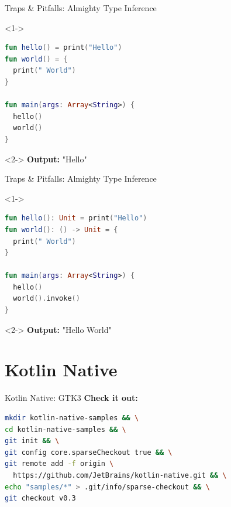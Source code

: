 \begin{frame}[fragile]{Traps \& Pitfalls: Almighty Type Inference}
	\begin{overlayarea}{\textwidth}{.6\textheight}
		\begin{onlyenv}<1->
\begin{lstlisting}[language=Kotlin,basicstyle=\ttfamily\small]
fun hello() = print("Hello")
fun world() = {
  print(" World")
}

fun main(args: Array<String>) {
  hello()
  world()
}	
\end{lstlisting}
		\end{onlyenv}
		\begin{onlyenv}<2->
			\textbf{Output:} "Hello"
		\end{onlyenv}
	\end{overlayarea}
\end{frame}

\begin{frame}[fragile]{Traps \& Pitfalls: Almighty Type Inference}
	\begin{overlayarea}{\textwidth}{.6\textheight}
		\begin{onlyenv}<1->
\begin{lstlisting}[language=Kotlin,basicstyle=\ttfamily\small]
fun hello(): Unit = print("Hello")
fun world(): () -> Unit = {
  print(" World")
}

fun main(args: Array<String>) {
  hello()
  world().invoke()
}
\end{lstlisting}
		\end{onlyenv}
		\begin{onlyenv}<2->
			\textbf{Output:} "Hello World"
		\end{onlyenv}
	\end{overlayarea}
\end{frame}

\section{Kotlin Native}

\begin{frame}[fragile]{Kotlin Native: GTK3}
	\textbf{Check it out:}\\\vspace{.5\baselineskip}
\begin{lstlisting}[language=bash,basicstyle=\ttfamily\small]
mkdir kotlin-native-samples && \
cd kotlin-native-samples && \
git init && \
git config core.sparseCheckout true && \
git remote add -f origin \
  https://github.com/JetBrains/kotlin-native.git && \
echo "samples/*" > .git/info/sparse-checkout && \
git checkout v0.3
\end{lstlisting}
\end{frame}

